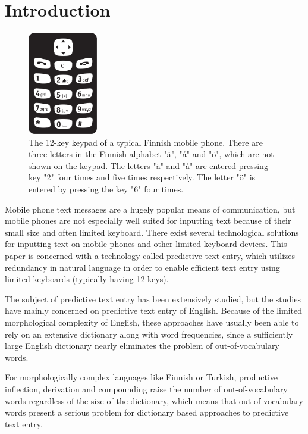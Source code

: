 \documentclass{llncs}
\begin{document}
\section{Introduction}

\begin{figure}[hbt!]
\begin{center}
\includegraphics[width=1.2in]{Nappaimet.pdf}
\caption{The 12-key keypad of a typical Finnish mobile phone. There
  are three letters in the Finnish alphabet "\"{a}", "å" and "\"{o}",
  which are not shown on the keypad. The letters "\"{a}" and "å" are
  entered pressing key "2" four times and five times respectively. The
  letter "\"{o}" is entered by pressing the key "6" four
  times.}\label{keypad}
\end{center}
\end{figure}

Mobile phone text messages are a hugely popular means of
communication, but mobile phones are not especially well suited for
inputting text because of their small size and often limited
keyboard. There exist several technological solutions for inputting
text on mobile phones and other limited keyboard devices. This paper
is concerned with a technology called predictive text entry, which
utilizes redundancy in natural language in order to enable efficient
text entry using limited keyboards (typically having 12 keys).

The subject of predictive text entry has been extensively studied, but
the studies have mainly concerned on predictive text entry of
English. Because of the limited morphological complexity of English,
these approaches have usually been able to rely on an extensive
dictionary along with word frequencies, since a sufficiently large
English dictionary nearly eliminates the problem of out-of-vocabulary
words. 

For morphologically complex languages like Finnish or Turkish,
productive inflection, derivation and compounding raise the number of
out-of-vocabulary words regardless of the size of the dictionary,
which means that out-of-vocabulary words present a serious problem for
dictionary based approaches to predictive text entry.
\end{document}
